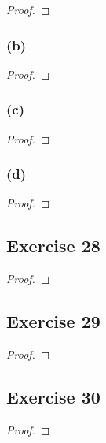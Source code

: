 \documentclass[14pt]{extarticle}
\begin{document}
\begin{proof}

\end{proof}

\subsubsection{(b)}

\begin{proof}

\end{proof}

\subsubsection{(c)}

\begin{proof}

\end{proof}

\subsubsection{(d)}

\begin{proof}

\end{proof}

\subsection{Exercise 28}

\begin{proof}

\end{proof}

\subsection{Exercise 29}

\begin{proof}

\end{proof}

\subsection{Exercise 30}

\begin{proof}

\end{proof}
\end{document}
